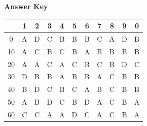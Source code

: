\documentclass[11pt,a4paper]{article}
\begin{document}
\textbf{Answer Key}
\begin{tabular}{ | c | c c c c c c c c c c | }
\hline
 & 1 & 2 & 3 & 4 & 5 & 6 & 7 & 8 & 9 & 0 \\
\hline
0 & A & D & C & B & B & B & C & A & D & B \\
10 & A & C & B & C & B & A & B & B & B & B \\
20 & A & A & C & A & C & B & C & B & D & C \\
30 & D & B & B & A & B & B & A & C & B & B \\
40 & B & D & C & B & C & A & B & C & B & B \\
50 & A & B & D & C & B & D & A & C & B & A \\
60 & C & C & A & A & D & C & A & C & B & A \\
\hline
\end{tabular}
\clearpage
\end{document}
